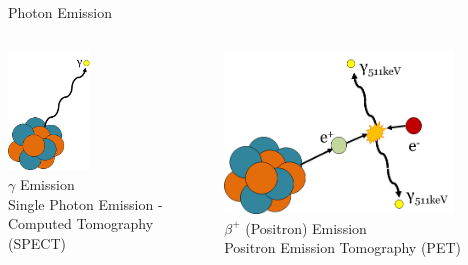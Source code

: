 \begin{frame}[c]{Photon Emission}
    \centering
    \begin{columns}[c]
        \begin{column}[c]{6cm}
            \centering
            \includegraphics[width=0.42\textwidth]{images/gammaemission}\\[0.5cm]
            $\gamma$ Emission\\ Single Photon Emission - Computed Tomography (SPECT)
        \end{column}
        \begin{column}[c]{6cm}
            \centering
            \includegraphics[width=0.8\textwidth]{images/betaemission}\\[0.5cm]
            $\beta^{+}$ (Positron) Emission\\
            Positron Emission Tomography (PET)
        \end{column}
    \end{columns}
\end{frame}

